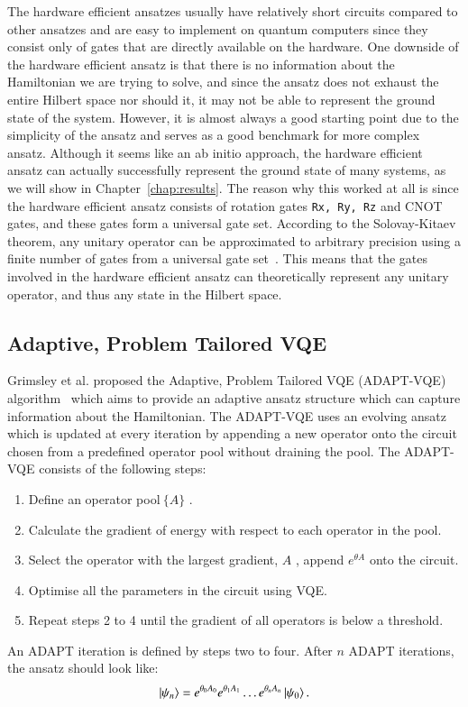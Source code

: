 The hardware efficient ansatzes usually have relatively short circuits compared to other ansatzes and are easy to implement on quantum computers since they consist only of gates that are directly available on the hardware. One downside of the hardware efficient ansatz is that there is no information about the Hamiltonian we are trying to solve, and since the ansatz does not exhaust the entire Hilbert space nor should it, it may not be able to represent the ground state of the system. However, it is almost always a good starting point due to the simplicity of the ansatz and serves as a good benchmark for more complex ansatz. 
Although it seems like an ab initio approach, the hardware efficient ansatz can actually successfully represent the ground state of many systems, as we will show in Chapter~\ref{chap:results}. The reason why this worked at all is since the hardware efficient ansatz consists of rotation gates \texttt{Rx, Ry, Rz} and CNOT gates, and these gates form a universal gate set. According to the Solovay-Kitaev theorem, any unitary operator can be approximated to arbitrary precision using a finite number of gates from a universal gate set~\cite{Kitaev1997}. This means that the gates involved in the hardware efficient ansatz can theoretically represent any unitary operator, and thus any state in the Hilbert space. 

\subsection{Adaptive, Problem Tailored VQE}
\label{sub:adapt_vqe}
Grimsley et al. proposed the Adaptive, Problem Tailored VQE (ADAPT-VQE) algorithm~\cite{grimsley2019} which aims to provide an adaptive ansatz structure which can capture information about the Hamiltonian.
The ADAPT-VQE uses an evolving ansatz which is updated at every iteration by appending a new operator onto the circuit chosen from a predefined operator pool without draining the pool. The ADAPT-VQE consists of the following steps:
\begin{enumerate}
	\item Define an operator pool$ \ \{ A \}  $ . 
	\item Calculate the gradient of energy with respect to each operator in the pool.
	\item Select the operator with the largest gradient, $ A $ , append $ e^{\theta A} $ onto the circuit.
	\item Optimise all the parameters in the circuit using VQE.
	\item Repeat steps 2 to 4 until the gradient of all operators is below a threshold.
\end{enumerate}
An ADAPT iteration is defined by steps two to four.
After $ n $ ADAPT iterations, the ansatz should look like:
\[ \ket{\psi_{n}} = e^{\theta_0 A_0} e^{\theta_1 A_1} \ldots e^{\theta_n A_n}\ket{\psi_{0}}. \] 
